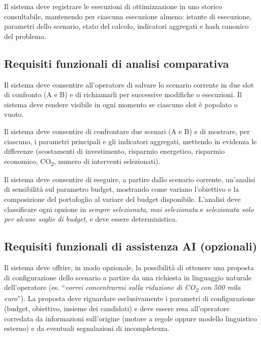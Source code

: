  \label{rf:storico}
Il sistema deve registrare le esecuzioni di ottimizzazione in uno storico consultabile, mantenendo per ciascuna esecuzione almeno: istante di esecuzione, parametri dello scenario, stato del calcolo, indicatori aggregati e hash canonico del problema.

\subsection{Requisiti funzionali di analisi comparativa}

 \label{rf:scenari_salvati}
Il sistema deve consentire all'operatore di salvare lo scenario corrente in due slot di confronto (A e B) e di richiamarli per successive modifiche o esecuzioni. Il sistema deve rendere visibile in ogni momento se ciascuno slot è popolato o vuoto.

 \label{rf:confronto}
Il sistema deve consentire di confrontare due scenari (A e B) e di mostrare, per ciascuno, i parametri principali e gli indicatori aggregati, mettendo in evidenza le differenze (scostamenti di investimento, risparmio energetico, risparmio economico, CO\textsubscript{2}, numero di interventi selezionati).

 \label{rf:sensibilita}
Il sistema deve consentire di eseguire, a partire dallo scenario corrente, un'analisi di sensibilità sul parametro budget, mostrando come variano l'obiettivo e la composizione del portafoglio al variare del budget disponibile. L'analisi deve classificare ogni opzione in \emph{sempre selezionata}, \emph{mai selezionata} e \emph{selezionata solo per alcune soglie di budget}, e deve essere deterministica.

\subsection{Requisiti funzionali di assistenza AI (opzionali)}

 \label{rf:ai_proposta}
Il sistema deve offrire, in modo opzionale, la possibilità di ottenere una proposta di configurazione dello scenario a partire da una richiesta in linguaggio naturale dell'operatore (es. ``\emph{vorrei concentrarmi sulla riduzione di CO\textsubscript{2} con 500 mila euro}''). La proposta deve riguardare esclusivamente i parametri di configurazione (budget, obiettivo, insieme dei candidati) e deve essere resa all'operatore corredata da informazioni sull'origine (motore a regole oppure modello linguistico esterno) e da eventuali segnalazioni di incompletezza.

